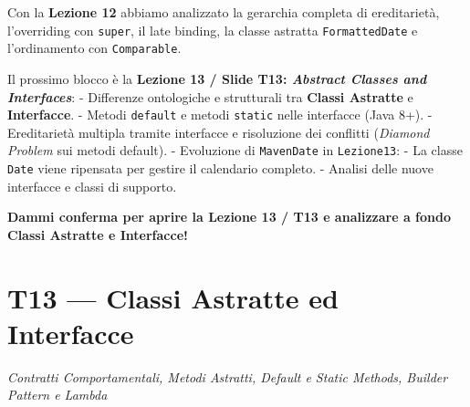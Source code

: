 \documentclass[11pt,a4paper,oneside]{report}
\newcommand{\passthrough}[1]{#1}
\begin{document}
\begin{studynote} Con la \textbf{Lezione 12} abbiamo analizzato la gerarchia
completa di ereditarietà, l'overriding con
\passthrough{\lstinline!super!}, il late binding, la classe astratta
\passthrough{\lstinline!FormattedDate!} e l'ordinamento con
\passthrough{\lstinline!Comparable!}.

Il prossimo blocco è la \textbf{Lezione 13 / Slide T13: \emph{Abstract
Classes and Interfaces}}: - Differenze ontologiche e strutturali tra
\textbf{Classi Astratte} e \textbf{Interfacce}. - Metodi
\passthrough{\lstinline!default!} e metodi
\passthrough{\lstinline!static!} nelle interfacce (Java 8+). -
Ereditarietà multipla tramite interfacce e risoluzione dei conflitti
(\emph{Diamond Problem} sui metodi default). - Evoluzione di
\passthrough{\lstinline!MavenDate!} in
\passthrough{\lstinline!Lezione13!}: - La classe
\passthrough{\lstinline!Date!} viene ripensata per gestire il calendario
completo. - Analisi delle nuove interfacce e classi di supporto.
\end{studynote}

\textbf{Dammi conferma per aprire la Lezione 13 / T13 e analizzare a
fondo Classi Astratte e Interfacce!}

\newpage
\chapter[T13 --- Classi Astratte ed Interfacce]{T13 --- Classi Astratte ed Interfacce}
\label{chap:t13}

{\small\sffamily\color{accentblue!80!black}\textit{Contratti Comportamentali, Metodi Astratti, Default e Static Methods, Builder Pattern e Lambda}}

\vspace{0.8em}
\end{document}
